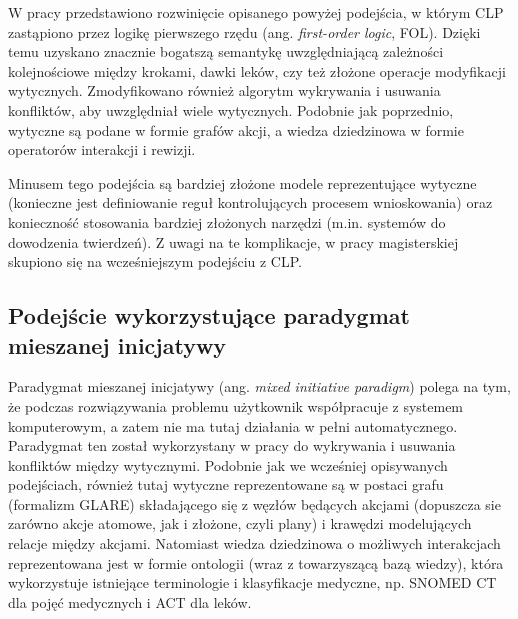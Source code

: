 W pracy \cite{SzWilk} przedstawiono rozwinięcie opisanego powyżej podejścia, w którym CLP zastąpiono przez logikę pierwszego rzędu (ang. \textit{first-order logic}, FOL). Dzięki temu uzyskano znacznie bogatszą semantykę uwzględniającą zależności kolejnościowe między krokami, dawki leków, czy też złożone operacje modyfikacji wytycznych. Zmodyfikowano również algorytm wykrywania i usuwania konfliktów, aby uwzględniał wiele wytycznych. Podobnie jak poprzednio, wytyczne są podane w formie grafów akcji, a wiedza dziedzinowa w formie operatorów interakcji i rewizji.

Minusem tego podejścia są bardziej złożone modele reprezentujące wytyczne (konieczne jest definiowanie reguł kontrolujących procesem wnioskowania) oraz konieczność stosowania bardziej złożonych narzędzi (m.in. systemów do dowodzenia twierdzeń). Z uwagi na te komplikacje, w pracy magisterskiej skupiono się na wcześniejszym podejściu z CLP.



\subsection{Podejście wykorzystujące paradygmat mieszanej inicjatywy}

Paradygmat mieszanej inicjatywy (ang. \textit{mixed initiative paradigm}) polega na tym, że podczas rozwiązywania problemu użytkownik współpracuje z systemem komputerowym, a zatem nie ma tutaj działania w pełni automatycznego. Paradygmat ten został wykorzystany w pracy \cite{Piovesan} do wykrywania i usuwania konfliktów między wytycznymi. Podobnie jak we wcześniej opisywanych podejściach, również tutaj wytyczne reprezentowane są w postaci grafu (formalizm GLARE) składającego się z węzłów będących akcjami (dopuszcza sie zarówno akcje atomowe, jak i złożone, czyli plany) i krawędzi modelujących relacje między akcjami. Natomiast wiedza dziedzinowa o możliwych interakcjach reprezentowana jest w formie ontologii (wraz z towarzyszącą bazą wiedzy), która wykorzystuje istniejące terminologie i klasyfikacje medyczne, np. SNOMED CT dla pojęć medycznych i ACT dla leków.
  
